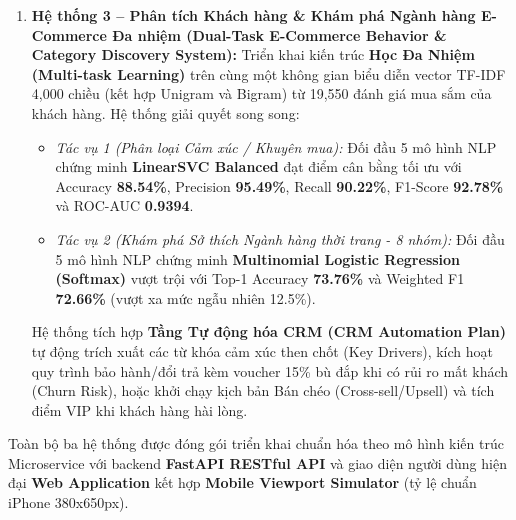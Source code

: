 \documentclass[12pt,a4paper]{report}
\begin{document}
\begin{enumerate}[leftmargin=2em]
    \item \textbf{Hệ thống 3 -- Phân tích Khách hàng \& Khám phá Ngành hàng E-Commerce Đa nhiệm (Dual-Task E-Commerce Behavior \& Category Discovery System):}
    Triển khai kiến trúc \textbf{Học Đa Nhiệm (Multi-task Learning)} trên cùng một không gian biểu diễn vector TF-IDF 4,000 chiều (kết hợp Unigram và Bigram) từ 19,550 đánh giá mua sắm của khách hàng. Hệ thống giải quyết song song:
    \begin{itemize}
        \item \textit{Tác vụ 1 (Phân loại Cảm xúc / Khuyên mua):} Đối đầu 5 mô hình NLP chứng minh \textbf{LinearSVC Balanced} đạt điểm cân bằng tối ưu với Accuracy \textbf{88.54\%}, Precision \textbf{95.49\%}, Recall \textbf{90.22\%}, F1-Score \textbf{92.78\%} và ROC-AUC \textbf{0.9394}.
        \item \textit{Tác vụ 2 (Khám phá Sở thích Ngành hàng thời trang - 8 nhóm):} Đối đầu 5 mô hình NLP chứng minh \textbf{Multinomial Logistic Regression (Softmax)} vượt trội với Top-1 Accuracy \textbf{73.76\%} và Weighted F1 \textbf{72.66\%} (vượt xa mức ngẫu nhiên 12.5\%).
    \end{itemize}
    Hệ thống tích hợp \textbf{Tầng Tự động hóa CRM (CRM Automation Plan)} tự động trích xuất các từ khóa cảm xúc then chốt (Key Drivers), kích hoạt quy trình bảo hành/đổi trả kèm voucher 15\% bù đắp khi có rủi ro mất khách (Churn Risk), hoặc khởi chạy kịch bản Bán chéo (Cross-sell/Upsell) và tích điểm VIP khi khách hàng hài lòng.
\end{enumerate}

Toàn bộ ba hệ thống được đóng gói triển khai chuẩn hóa theo mô hình kiến trúc Microservice với backend \textbf{FastAPI RESTful API} và giao diện người dùng hiện đại \textbf{Web Application} kết hợp \textbf{Mobile Viewport Simulator} (tỷ lệ chuẩn iPhone 380x650px).
\end{document}
